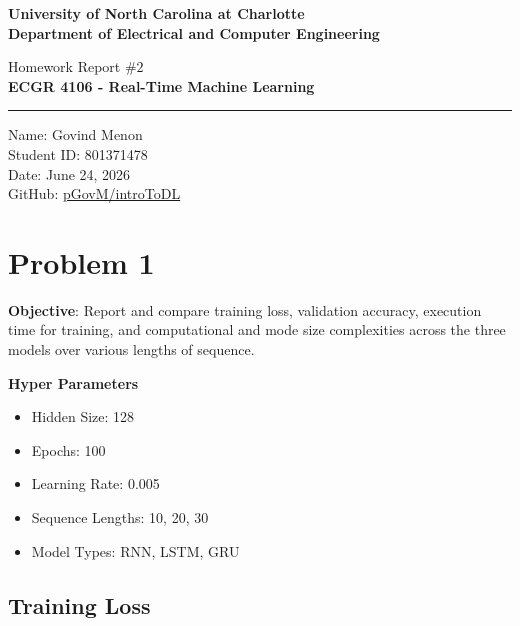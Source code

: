\documentclass[a4paper]{article}
\begin{document}
\begin{titlepage}
    \thispagestyle{fancy}
    \renewcommand{\headrulewidth}{0pt}
    \begin{center}
        \vspace*{2cm}

        \LARGE\textbf{University of North Carolina at Charlotte\\
                        Department of Electrical and Computer Engineering}
        
        \vspace*{4cm}

        Homework Report $\# 2$ \\
        \Large\textbf{ECGR 4106 - Real-Time Machine Learning} \\
        
        \noindent\rule{14cm}{0.4pt}

        \vspace*{3cm}

        Name: Govind Menon \\
        Student ID: 801371478 \\
        Date: June 24, 2026 \\
        GitHub: \href{https://github.com/pGovm/introToDL.git}{pGovM/introToDL}

    \end{center}
\end{titlepage}

\section{\textbf{Problem 1}}
\textbf{Objective}: Report and compare training loss, validation accuracy, execution time for training, and computational and mode size complexities across the three models over various lengths of sequence.

\textbf{Hyper Parameters}
\begin{itemize}
    \item Hidden Size: 128
    \item Epochs: 100
    \item Learning Rate: 0.005
    \item Sequence Lengths: 10, 20, 30
    \item Model Types: RNN, LSTM, GRU
\end{itemize}

\subsection*{Training Loss}
\end{document}
